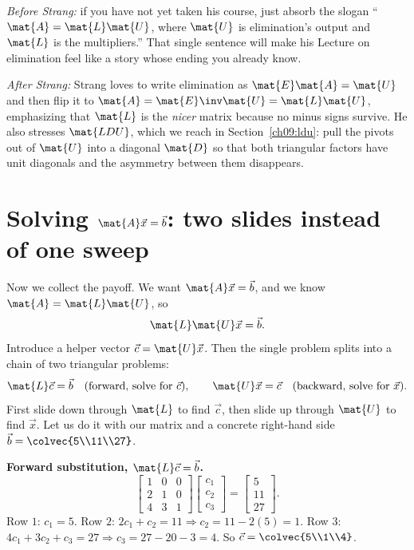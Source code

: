 \begin{strangbox}
\emph{Before Strang:} if you have not yet taken his course, just absorb the slogan
``$\mat{A}=\mat{L}\mat{U}$, where $\mat{U}$ is elimination's output and $\mat{L}$ is the
multipliers.'' That single sentence will make his Lecture on elimination feel like a story
whose ending you already know.

\emph{After Strang:} Strang loves to write elimination as
$\mat{E}\mat{A}=\mat{U}$ and then flip it to $\mat{A}=\mat{E}\inv\mat{U}=\mat{L}\mat{U}$,
emphasizing that $\mat{L}$ is the \emph{nicer} matrix because no minus signs survive. He
also stresses $\mat{LDU}$, which we reach in
Section~\ref{ch09:ldu}: pull the pivots out of $\mat{U}$ into a diagonal $\mat{D}$ so that
both triangular factors have unit diagonals and the asymmetry between them disappears.
\end{strangbox}

\section{Solving \texorpdfstring{$\mat{A}\vec{x}=\vec{b}$}{Ax=b}: two slides instead of one sweep}
\label{ch09:two-slides}

Now we collect the payoff. We want $\mat{A}\vec{x}=\vec{b}$, and we know $\mat{A}=\mat{L}\mat{U}$,
so
\[
  \mat{L}\mat{U}\vec{x} = \vec{b}.
\]
Introduce a helper vector $\vec{c} = \mat{U}\vec{x}$. Then the single problem splits into a
chain of two triangular problems:
\[
  \mat{L}\vec{c} = \vec{b} \quad(\text{forward, solve for }\vec{c}),
  \qquad
  \mat{U}\vec{x} = \vec{c} \quad(\text{backward, solve for }\vec{x}).
\]
First slide down through $\mat{L}$ to find $\vec{c}$, then slide up through $\mat{U}$ to find
$\vec{x}$. Let us do it with our matrix and a concrete right-hand side
$\vec{b} = \colvec{5\\11\\27}$.

\textbf{Forward substitution, $\mat{L}\vec{c}=\vec{b}$.}
\[
  \begin{bmatrix} 1 & 0 & 0 \\ 2 & 1 & 0 \\ 4 & 3 & 1 \end{bmatrix}
  \begin{bmatrix} c_1 \\ c_2 \\ c_3 \end{bmatrix}
  = \begin{bmatrix} 5 \\ 11 \\ 27 \end{bmatrix}.
\]
Row $1$: $c_1 = 5$. Row $2$: $2c_1 + c_2 = 11 \Rightarrow c_2 = 11 - 2(5) = 1$. Row $3$:
$4c_1 + 3c_2 + c_3 = 27 \Rightarrow c_3 = 27 - 20 - 3 = 4$. So
$\vec{c} = \colvec{5\\1\\4}$.

